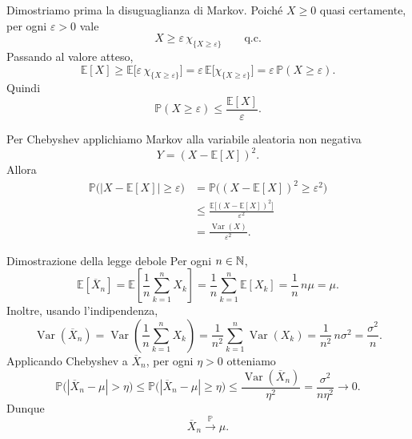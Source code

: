 \documentclass[a4paper]{article}
\begin{document}
\begin{snippetproof}{}
    Dimostriamo prima la disuguaglianza di Markov. Poiché \(X\geq0\) quasi certamente, per ogni \(\varepsilon>0\) vale
    \[
        X\geq \varepsilon\,\chi_{\{X\geq \varepsilon\}}
        \qquad
        \text{q.c.}
    \]
    Passando al valore atteso,
    \[
        \mathbb{E}[X]
        \geq
        \mathbb{E}\bigl[\varepsilon\,\chi_{\{X\geq \varepsilon\}}\bigr]
        =
        \varepsilon\,\mathbb{E}\bigl[\chi_{\{X\geq \varepsilon\}}\bigr]
        =
        \varepsilon\,\mathbb{P}(X\geq \varepsilon).
    \]
    Quindi
    \[
        \mathbb{P}(X\geq\varepsilon)
        \leq
        \frac{\mathbb{E}[X]}{\varepsilon}.
    \]

    Per Chebyshev applichiamo Markov alla variabile aleatoria non negativa
    \[
        Y=(X-\mathbb{E}[X])^2.
    \]
    Allora
    \[
        \begin{aligned}
            \mathbb{P}\bigl(|X-\mathbb{E}[X]|\geq \varepsilon\bigr)
            &=
            \mathbb{P}\bigl((X-\mathbb{E}[X])^2\geq \varepsilon^2\bigr)\\
            &\leq
            \frac{\mathbb{E}\bigl[(X-\mathbb{E}[X])^2\bigr]}{\varepsilon^2}\\
            &=
            \frac{\operatorname{Var}(X)}{\varepsilon^2}.
        \end{aligned}
    \]
\end{snippetproof}

\begin{snippetproof}{Dimostrazione della legge debole}
    Per ogni \(n\in\mathbb{N}\),
    \[
        \mathbb{E}[\overline{X}_n]
        =
        \mathbb{E}\left[\frac1n\sum_{k=1}^{n}X_k\right]
        =
        \frac1n\sum_{k=1}^{n}\mathbb{E}[X_k]
        =
        \frac1n\,n\mu
        =
        \mu.
    \]
    Inoltre, usando l'indipendenza,
    \[
        \operatorname{Var}(\overline{X}_n)
        =
        \operatorname{Var}\left(\frac1n\sum_{k=1}^{n}X_k\right)
        =
        \frac1{n^2}\sum_{k=1}^{n}\operatorname{Var}(X_k)
        =
        \frac1{n^2}\,n\sigma^2
        =
        \frac{\sigma^2}{n}.
    \]
    Applicando Chebyshev a \(\overline{X}_n\), per ogni \(\eta>0\) otteniamo
    \[
        \mathbb{P}\bigl(|\overline{X}_n-\mu|>\eta\bigr)
        \leq
        \mathbb{P}\bigl(|\overline{X}_n-\mu|\geq\eta\bigr)
        \leq
        \frac{\operatorname{Var}(\overline{X}_n)}{\eta^2}
        =
        \frac{\sigma^2}{n\eta^2}
        \longrightarrow 0.
    \]
    Dunque
    \[
        \overline{X}_n\xrightarrow{\mathbb{P}}\mu.
    \]
\end{snippetproof}
\end{document}
